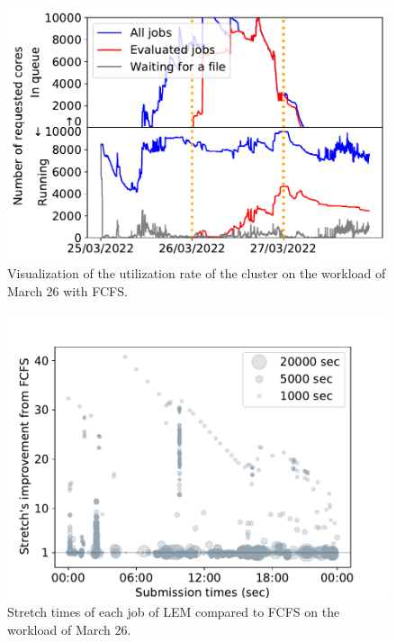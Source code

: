 \documentclass[conference,10pt]{IEEEtran}
\begin{document}
\begin{figure}[t]\centering\includegraphics[width=0.9\linewidth]{../MBSS/plot/Cluster_usage/2022-03-26->2022-03-26_V10000_Fcfs_Used_nodes_Reduced_450_128_32_256_4_1024_core_by_core.pdf}\caption{Visualization of the utilization rate of the cluster on the workload of March 26 with FCFS.}
\label{cluster_usage.03-26_fcfs}\end{figure}
\begin{figure}[t]\centering\includegraphics[width=0.9\linewidth]{../MBSS/plot/Stretch_times/Stretch_times_FCFS_LEM_2022-03-26->2022-03-26_V10000_450_128_32_256_4_1024.pdf}\caption{Stretch times of each job of LEM compared to FCFS on the workload of March 26.}
\label{vs_fcfs_lem_03-26}\end{figure}
\end{document}
